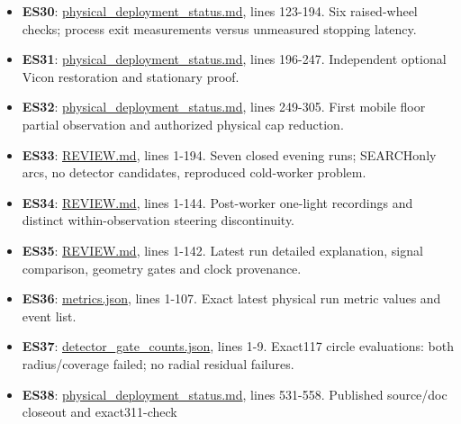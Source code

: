 \documentclass[
  10pt,
  letterpaper,
]{article}
\begin{document}
\begin{itemize}
  compatibility and ownership-stop review.
\item
  \textbf{ES30}:
  \href{/home/mattb/dsim-lab/docs/codex/gesc_gaussian/v3/physical_deployment_status.md:123}{physical\_deployment\_status.md},
  lines 123-194. Six raised-wheel checks; process exit measurements
  versus unmeasured stopping latency.
\item
  \textbf{ES31}:
  \href{/home/mattb/dsim-lab/docs/codex/gesc_gaussian/v3/physical_deployment_status.md:196}{physical\_deployment\_status.md},
  lines 196-247. Independent optional Vicon restoration and stationary
  proof.
\item
  \textbf{ES32}:
  \href{/home/mattb/dsim-lab/docs/codex/gesc_gaussian/v3/physical_deployment_status.md:249}{physical\_deployment\_status.md},
  lines 249-305. First mobile floor partial observation and authorized
  physical cap reduction.
\item
  \textbf{ES33}:
  \href{/home/mattb/Experiments/GESC-Gaussian/v3/physical_runs/night_20260929_review/REVIEW.md:1}{REVIEW.md},
  lines 1-194. Seven closed evening runs; SEARCHonly arcs, no detector
  candidates, reproduced cold-worker problem.
\item
  \textbf{ES34}:
  \href{/home/mattb/Experiments/GESC-Gaussian/v3/physical_runs/single_light_review_20261001T035033Z/REVIEW.md:1}{REVIEW.md},
  lines 1-144. Post-worker one-light recordings and distinct
  within-observation steering discontinuity.
\item
  \textbf{ES35}:
  \href{/home/mattb/Experiments/GESC-Gaussian/v3/physical_runs/post_steering_review_20261001T215339Z/REVIEW.md:1}{REVIEW.md},
  lines 1-142. Latest run detailed explanation, signal comparison,
  geometry gates and clock provenance.
\item
  \textbf{ES36}:
  \href{/home/mattb/Experiments/GESC-Gaussian/v3/physical_runs/post_steering_review_20261001T215339Z/metrics.json:1}{metrics.json},
  lines 1-107. Exact latest physical run metric values and event list.
\item
  \textbf{ES37}:
  \href{/home/mattb/Experiments/GESC-Gaussian/v3/physical_runs/post_steering_review_20261001T215339Z/detector_gate_counts.json:1}{detector\_gate\_counts.json},
  lines 1-9. Exact117 circle evaluations: both radius/coverage failed;
  no radial residual failures.
\item
  \textbf{ES38}:
  \href{/home/mattb/dsim-lab/docs/codex/gesc_gaussian/v3/physical_deployment_status.md:531}{physical\_deployment\_status.md},
  lines 531-558. Published source/doc closeout and exact311-check

\end{itemize}
\end{document}
